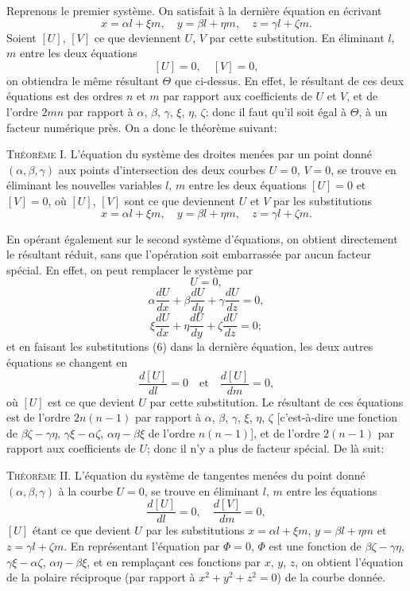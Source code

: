 \documentclass[11pt]{article}
\begin{document}
\medskip
Reprenons le premier syst\`eme. On satisfait \`a la derni\`ere \'equation en \'ecrivant
\[
x = \alpha l + \xi m, \quad y = \beta l + \eta m, \quad z = \gamma l + \zeta m \tag{6}.
\]
Soient $[U]$, $[V]$ ce que deviennent $U$, $V$ par cette substitution. En \'eliminant $l$, $m$
entre les deux \'equations
\[
[U] = 0, \quad [V] = 0,
\]
on obtiendra le m\^eme r\'esultant $\Theta$ que ci-dessus. En effet, le r\'esultant de ces deux
\'equations est des ordres $n$ et $m$ par rapport aux coefficients de $U$ et $V$, et de l'ordre
$2 m n$ par rapport \`a $\alpha$, $\beta$, $\gamma$, $\xi$, $\eta$, $\zeta$: donc il faut qu'il soit \'egal \`a $\Theta$, \`a un facteur
num\'erique pr\`es. On a donc le th\'eor\`eme suivant:

\medskip
\noindent\textsc{Th\'eor\`eme I.} L'\'equation du syst\`eme des droites men\'ees par un point donn\'e
$(\alpha, \beta, \gamma)$ aux points d'intersection des deux courbes $U = 0$, $V = 0$, se trouve en \'eliminant
les nouvelles variables $l$, $m$ entre les deux \'equations $[U] = 0$ et $[V] = 0$, o\`u $[U]$, $[V]$
sont ce que deviennent $U$ et $V$ par les substitutions
\[
x = \alpha l + \xi m, \quad y = \beta l + \eta m, \quad z = \gamma l + \zeta m \tag{7}.
\]

En op\'erant \'egalement sur le second syst\`eme d'\'equations, on obtient directement
le r\'esultant r\'eduit, sans que l'op\'eration soit embarrass\'ee par aucun facteur sp\'ecial. En
effet, on peut remplacer le syst\`eme par
\[
U = 0,
\]
\[
\alpha\frac{dU}{dx} + \beta\frac{dU}{dy} + \gamma\frac{dU}{dz} = 0,
\]
\[
\xi\frac{dU}{dx} + \eta\frac{dU}{dy} + \zeta\frac{dU}{dz} = 0; \tag{8}
\]
et en faisant les substitutions (6) dans la derni\`ere \'equation, les deux autres \'equations
se changent en
\[
\frac{d[U]}{dl} = 0\quad\text{et}\quad \frac{d[U]}{dm} = 0,
\]
o\`u $[U]$ est ce que devient $U$ par cette substitution. Le r\'esultant de ces \'equations
est de l'ordre $2 n(n - 1)$ par rapport \`a $\alpha$, $\beta$, $\gamma$, $\xi$, $\eta$, $\zeta$ [c'est-\`a-dire une fonction de
$\beta\zeta - \gamma\eta$, $\gamma\xi - \alpha\zeta$, $\alpha\eta - \beta\xi$ de l'ordre $n(n - 1)$], et de l'ordre $2(n - 1)$ par rapport aux
coefficients de $U$; donc il n'y a plus de facteur sp\'ecial. De l\`a suit:

\medskip
\noindent\textsc{Th\'eor\`eme II.} L'\'equation du syst\`eme de tangentes men\'ees du point donn\'e
$(\alpha, \beta, \gamma)$ \`a la courbe $U = 0$, se trouve en \'eliminant $l$, $m$ entre les \'equations
\[
\frac{d[U]}{dl} = 0, \quad \frac{d[V]}{dm} = 0,
\]
$[U]$ \'etant ce que devient $U$ par les substitutions $x = \alpha l + \xi m$, $y = \beta l + \eta m$ et $z = \gamma l + \zeta m$.
En repr\'esentant l'\'equation par $\Phi = 0$, $\Phi$ est une fonction de $\beta\zeta - \gamma\eta$, $\gamma\xi - \alpha\zeta$, $\alpha\eta - \beta\xi$,
et en rempla\c{c}ant ces fonctions par $x$, $y$, $z$, on obtient l'\'equation de la polaire r\'eciproque
(par rapport \`a $x^{2} + y^{2} + z^{2} = 0$) de la courbe donn\'ee.
\end{document}
